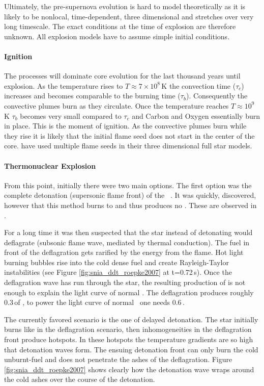 Ultimately, the pre-supernova evolution is hard to model theoretically as it is likely to be nonlocal, time-dependent, three dimensional and stretches over very long timescale. The exact conditions at the time of explosion are therefore unknown. All explosion models have to assume simple initial conditions. 

\paragraph{Ignition}
The \urca processes will dominate core evolution for the last thousand years until explosion. As the temperature rises to $T\approx7 \times 10^8$\,K \citep{2000ARA&A..38..191H} the convection time ($\tau_c$) increases and becomes comparable to the burning time ($\tau_b$). Consequently the convective plumes burn as they circulate. Once the temperature reaches $T\approx 10^9$\,K $\tau_b$ becomes very small compared to $\tau_c$ and Carbon and Oxygen essentially burn in place. 
This is the moment of ignition. As the convective plumes burn while they rise it is likely that the initial flame seed does not start in the center of the core. \cite{2005A&A...431..635R} have used multiple flame seeds in their three dimensional full star models.  

\paragraph{Thermonuclear Explosion}
From this point, initially there were two main options. The first option was the complete detonation (supersonic flame front) of the \cowd\ \citep{1969Ap&SS...5..180A}. It was quickly, discovered, however that this method burns to \nse and thus produces no \ime. These \ime are observed in \snia.

For a long time it was then suspected that the star instead of detonating would deflagrate (subsonic flame wave, mediated by thermal conduction). The fuel in front of the deflagration gets rarified by the energy from the flame. Hot light burning bubbles rise into the cold dense fuel and create Rayleigh-Taylor instabilities (see Figure \ref{fig:snia_ddt_roepke2007} at t=0.72\,s). 
Once the deflagration wave has run through the star, the resulting production of \Ni[56] is not enough to explain the light curve of normal \snia. The deflagration produces roughly 0.3\,\msun of \Ni[56], to power the light curve of normal \sneia\ one needs 0.6\,\msun \citep{2007Sci...315..825M}.

The currently favored scenario is the one of delayed detonation. The star initially burns like in the deflagration scenario, then inhomogeneities in the deflagration front produce hotspots. In these hotspots the temperature gradients are so high that detonation waves form. The ensuing detonation front can only burn the cold unburnt-fuel and does not penetrate the ashes of the deflagration. Figure \ref{fig:snia_ddt_roepke2007} shows clearly how the detonation wave wraps around the cold ashes over the course of the detonation.


